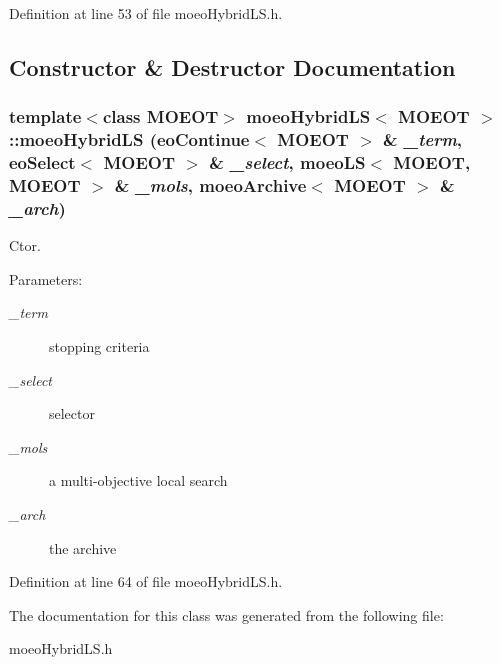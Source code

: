 Definition at line 53 of file moeo\-Hybrid\-LS.h.

\subsection{Constructor \& Destructor Documentation}
\subsubsection{\setlength{\rightskip}{0pt plus 5cm}template$<$class MOEOT$>$ \bf{moeo\-Hybrid\-LS}$<$ MOEOT $>$::\bf{moeo\-Hybrid\-LS} (\bf{eo\-Continue}$<$ MOEOT $>$ \& {\em \_\-term}, \bf{eo\-Select}$<$ MOEOT $>$ \& {\em \_\-select}, \bf{moeo\-LS}$<$ MOEOT, MOEOT $>$ \& {\em \_\-mols}, \bf{moeo\-Archive}$<$ MOEOT $>$ \& {\em \_\-arch})\hspace{0.3cm}{\tt  [inline]}}\label{classmoeoHybridLS_e669b2ca5e17467eb9819c71557aad53}


Ctor. 

\begin{Desc}
\item[Parameters:]
\begin{description}
\item[{\em \_\-term}]stopping criteria \item[{\em \_\-select}]selector \item[{\em \_\-mols}]a multi-objective local search \item[{\em \_\-arch}]the archive \end{description}
\end{Desc}


Definition at line 64 of file moeo\-Hybrid\-LS.h.

The documentation for this class was generated from the following file:\begin{CompactItemize}
\item 
moeo\-Hybrid\-LS.h\end{CompactItemize}
